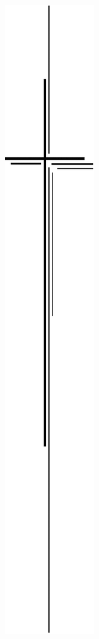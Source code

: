 \documentclass[ngerman,a4paper,11pt]{scrreprt}
\begin{document}
\begin{figure}[H]
\centering
\includegraphics[width=\textwidth,height=.8\textheight]{Bilder/Bilder/./750_0010_12728_Kreuz_1.png}
\end{figure}
\end{document}
